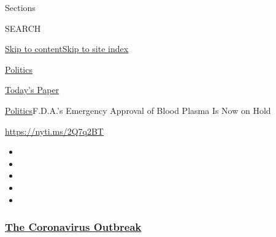 Sections

SEARCH

\protect\hyperlink{site-content}{Skip to
content}\protect\hyperlink{site-index}{Skip to site index}

\href{https://www.nytimes3xbfgragh.onion/section/politics}{Politics}

\href{https://myaccount.nytimes3xbfgragh.onion/auth/login?response_type=cookie\&client_id=vi}{}

\href{https://www.nytimes3xbfgragh.onion/section/todayspaper}{Today's
Paper}

\href{/section/politics}{Politics}\textbar{}F.D.A.'s Emergency Approval
of Blood Plasma Is Now on Hold

\url{https://nyti.ms/2Q7q2BT}

\begin{itemize}
\item
\item
\item
\item
\item
\end{itemize}

\hypertarget{the-coronavirus-outbreak}{%
\subsubsection{\texorpdfstring{\href{https://www.nytimes3xbfgragh.onion/news-event/coronavirus?name=styln-coronavirus-national\&region=TOP_BANNER\&variant=undefined\&block=storyline_menu_recirc\&action=click\&pgtype=Article\&impression_id=bfa44950-e382-11ea-a48e-b9252519409f}{The
Coronavirus
Outbreak}}{The Coronavirus Outbreak}}\label{the-coronavirus-outbreak}}

